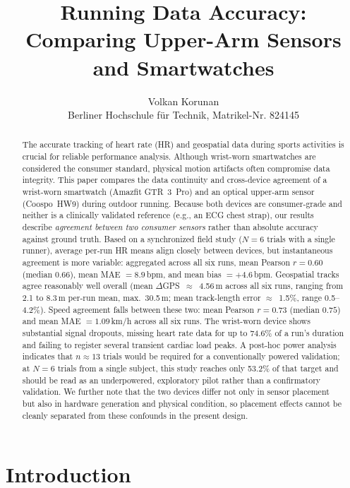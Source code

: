 \documentclass{acmsiggraph}
\title{Running Data Accuracy: Comparing Upper-Arm Sensors and Smartwatches}
\author{Volkan Korunan\\Berliner Hochschule f\"ur Technik, Matrikel-Nr. 824145}
\begin{document}
\maketitle

\begin{abstract}
The accurate tracking of heart rate (HR) and geospatial data during sports
activities is crucial for reliable performance analysis. Although
wrist-worn smartwatches are considered the consumer standard, physical
motion artifacts often compromise data integrity. This paper compares the
data continuity and cross-device agreement of a wrist-worn smartwatch
(Amazfit GTR~3~Pro) and an optical upper-arm sensor (Coospo~HW9) during
outdoor running. Because both devices are consumer-grade and neither is a
clinically validated reference (e.g., an ECG chest strap), our results
describe \emph{agreement between two consumer sensors} rather than
absolute accuracy against ground truth. Based on a synchronized field
study ($N=6$ trials with a single runner), average per-run HR means align
closely between devices, but instantaneous agreement is more variable:
aggregated across all six runs, mean Pearson $r=0.60$ (median $0.66$),
mean MAE $=8.9$\,bpm, and mean bias $=+4.6$\,bpm. Geospatial tracks agree
reasonably well overall (mean $\Delta$GPS~$\approx$~4.56\,m across all
six runs, ranging from 2.1 to 8.3\,m per-run mean, max.\ 30.5\,m; mean
track-length error $\approx$~1.5\%, range 0.5--4.2\%). Speed agreement
falls between these two: mean Pearson $r=0.73$ (median $0.75$) and mean
MAE $=1.09$\,km/h across all six runs. The wrist-worn
device shows
substantial signal dropouts, missing heart rate data for up to 74.6\% of
a run's duration and failing to register several transient cardiac load
peaks. A post-hoc power analysis indicates that $n\approx13$ trials would
be required for a conventionally powered validation; at $N=6$ trials from
a single subject, this study reaches only 53.2\% of that target and
should be read as an underpowered, exploratory pilot rather than a
confirmatory validation. We further note that the two devices differ not
only in sensor placement but also in hardware generation and physical
condition, so placement effects cannot be cleanly separated from these
confounds in the present design.
\end{abstract}

\section{Introduction}
\end{document}
